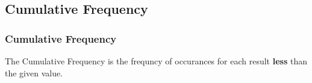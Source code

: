 \subsection{Cumulative Frequency}


\begin{frame}
  \frametitle{Cumulative Frequency}

  \begin{definition}
    The Cumulative Frequency is the frequncy of occurances for each
    result \textbf{less} than the given value.
  \end{definition}

\end{frame}


